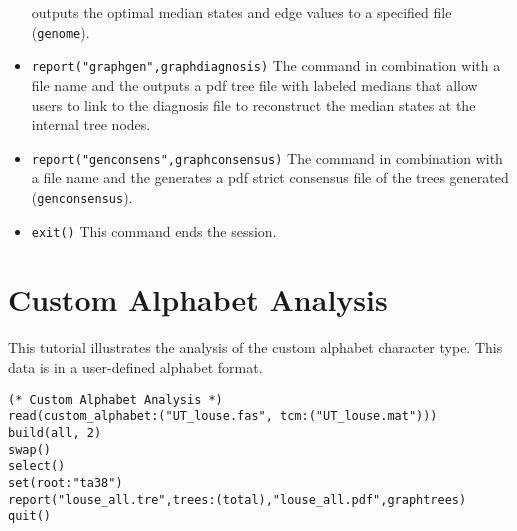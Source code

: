 \begin{itemize}
  outputs the optimal median states and edge values to a specified file (\texttt{genome}). 
\item \texttt{report("graphgen",graphdiagnosis)}  The  command in combination with a file name and the
  outputs a pdf tree file with labeled medians that allow users to link to the diagnosis file to reconstruct
 the median states at the internal tree nodes. 
\item \texttt{report("genconsens",graphconsensus)}  The  command in combination with a file 
name and the  generates a pdf strict consensus file of the trees generated 
(\texttt{genconsensus}). 
\item \texttt{exit()} This command ends the \poy session.
\end{itemize}


\section{Custom Alphabet Analysis}{\label{tutorial11}}

This tutorial illustrates the analysis of the custom alphabet character type.  This data is in a user-defined alphabet 
format.

\begin{verbatim}
(* Custom Alphabet Analysis *)
read(custom_alphabet:("UT_louse.fas", tcm:("UT_louse.mat")))
build(all, 2)
swap()
select()
set(root:"ta38")
report("louse_all.tre",trees:(total),"louse_all.pdf",graphtrees)
quit()
\end{verbatim}

